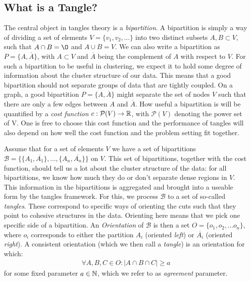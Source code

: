 \subsection{What is a Tangle?}
The central object in tangles theory is a \textit{bipartition}. 
A bipartition is simply a way of dividing a set of elements $V =  \{ v_1, v_2, \ldots \}$ into two distinct subsets $A, B \subset V$, such that
$A \cap B = \O$ and $A \cup B = V$. We can also write a bipartition as $P = \{A, \overline{A}\}$, with $A \subset V$ and $\overline{A}$ being the
complement of $A$ with respect to $V$. For such a bipartition to be useful in clustering, we expect it to hold some degree of information about the cluster 
structure of our data. This means that a good bipartition should not separate groups of data that are tightly coupled.
On a graph, a good bipartition $P = \{A, \overline{A}\}$ might separate the set of nodes $V$ such that there 
are only a few edges between $A$ and $\overline{A}$. How useful a bipartition is will be quantified by a \textit{cost function} $c: \mathcal{P}(V) \to \mathbb{R}$, 
with $\mathcal{P}(V)$ denoting the power set of V. One is free to choose this cost function and the performance of tangles will also depend on
how well the cost function and the problem setting fit together. 

Assume that for a set of elements $V$ we have a set of bipartitions $\mathcal{B} = \{\{A_1, \overline{A_1}\}, \ldots, \{A_n, \overline{A_n}\} \} $ on $V$.
This set of bipartitions, together with the cost function, should tell us a lot about the cluster structure of the data:
for all bipartitions, we know how much they do or don't separate dense regions in $V$. This information in the bipartitions is aggregated and brought into a useable form by the tangles framework. 
For this, we process $\mathcal{B}$ to a set of so-called \textit{tangles}. These
correspond to specific ways of orienting the cuts such that they point to cohesive structures in the data. 
Orienting here means that we pick one specific side of a bipartition. An \textit{Orientation} of $\mathcal{B}$ is then a set $O = \{o_1, o_2, \ldots o_n\}$, where $o_i$ 
corresponds to either the partition $A_i$ (oriented \textit{left}) or $\overline{A_i}$ (oriented \textit{right}). A consistent orientation (which we then call a \textit{tangle}) is an orientation for which:
\begin{align}
    \forall A,B,C \in O: \left| A \cap B \cap C \right| \ge a
\end{align}
for some fixed parameter $a \in \mathbb{N}$, which we refer to as \textit{agreement} parameter. 

